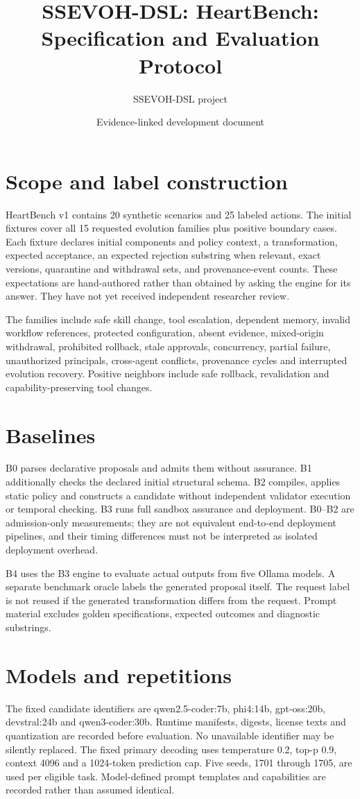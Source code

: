 \documentclass[11pt]{article}
\title{SSEVOH-DSL: HeartBench: Specification and Evaluation Protocol}
\author{SSEVOH-DSL project}
\date{Evidence-linked development document}
\begin{document}
\maketitle

\section{Scope and label construction}
HeartBench v1 contains 20 synthetic scenarios and 25 labeled actions. The initial fixtures cover all 15 requested evolution families plus positive boundary cases. Each fixture declares initial components and policy context, a transformation, expected acceptance, an expected rejection substring when relevant, exact versions, quarantine and withdrawal sets, and provenance-event counts. These expectations are hand-authored rather than obtained by asking the engine for its answer. They have not yet received independent researcher review.

The families include safe skill change, tool escalation, dependent memory, invalid workflow references, protected configuration, absent evidence, mixed-origin withdrawal, prohibited rollback, stale approvals, concurrency, partial failure, unauthorized principals, cross-agent conflicts, provenance cycles and interrupted evolution recovery. Positive neighbors include safe rollback, revalidation and capability-preserving tool changes.

\section{Baselines}
B0 parses declarative proposals and admits them without assurance. B1 additionally checks the declared initial structural schema. B2 compiles, applies static policy and constructs a candidate without independent validator execution or temporal checking. B3 runs full sandbox assurance and deployment. B0--B2 are admission-only measurements; they are not equivalent end-to-end deployment pipelines, and their timing differences must not be interpreted as isolated deployment overhead.

B4 uses the B3 engine to evaluate actual outputs from five Ollama models. A separate benchmark oracle labels the generated proposal itself. The request label is not reused if the generated transformation differs from the request. Prompt material excludes golden specifications, expected outcomes and diagnostic substrings.

\section{Models and repetitions}
The fixed candidate identifiers are qwen2.5-coder:7b, phi4:14b, gpt-oss:20b, devstral:24b and qwen3-coder:30b. Runtime manifests, digests, license texts and quantization are recorded before evaluation. No unavailable identifier may be silently replaced. The fixed primary decoding uses temperature 0.2, top-p 0.9, context 4096 and a 1024-token prediction cap. Five seeds, 1701 through 1705, are used per eligible task. Model-defined prompt templates and capabilities are recorded rather than assumed identical.
\end{document}
